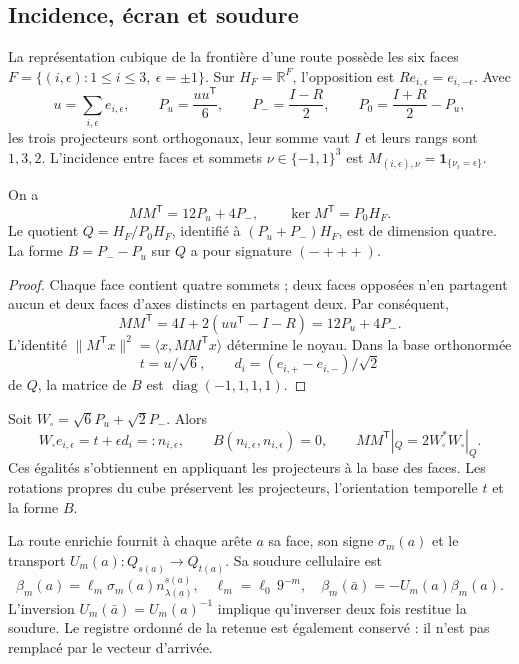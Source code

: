 \subsection{Incidence, écran et soudure}
\label{hmtcuatro:ant:pantalla}

La représentation cubique de la frontière d’une route possède les six faces \(F=\{(i,\epsilon):1\leq i\leq3,\ \epsilon=\pm1\}\). Sur \(H_F=\mathbb R^F\), l’opposition est \(Re_{i,\epsilon}=e_{i,-\epsilon}\). Avec
\[
 u=\sum_{i,\epsilon}e_{i,\epsilon},\qquad
 P_u=\frac{uu^{\mathsf T}}6,\qquad
 P_-=\frac{I-R}2,\qquad
 P_0=\frac{I+R}2-P_u ,
\]
les trois projecteurs sont orthogonaux, leur somme vaut \(I\) et leurs rangs sont \(1,3,2\). L’incidence entre faces et sommets \(\nu\in\{-1,1\}^3\) est \(M_{(i,\epsilon),\nu}=\mathbf1_{\{\nu_i=\epsilon\}}\).

\begin{proposition}
\label{hmtcuatro:ant:prop-pantalla}
On a
\[
 MM^{\mathsf T}=12P_u+4P_-,\qquad
 \ker M^{\mathsf T}=P_0H_F .
\]
Le quotient \(Q=H_F/P_0H_F\), identifié à \((P_u+P_-)H_F\), est de dimension quatre. La forme \(B=P_--P_u\) sur \(Q\) a pour signature \((-+++)\).
\end{proposition}
\begin{proof}
Chaque face contient quatre sommets ; deux faces opposées n’en partagent aucun et deux faces d’axes distincts en partagent deux. Par conséquent,
\[
 MM^{\mathsf T}=4I+2(uu^{\mathsf T}-I-R)
              =12P_u+4P_- .
\]
L’identité \(\|M^{\mathsf T}x\|^2=\langle x,MM^{\mathsf T}x\rangle\) détermine le noyau. Dans la base orthonormée
\[
 t=u/\sqrt6,\qquad d_i=(e_{i,+}-e_{i,-})/\sqrt2
\]
de \(Q\), la matrice de \(B\) est \(\operatorname{diag}(-1,1,1,1)\).
\end{proof}

Soit \(W_\square=\sqrt6P_u+\sqrt2P_-\). Alors
\[
 W_\square e_{i,\epsilon}=t+\epsilon d_i=:n_{i,\epsilon},
 \qquad B(n_{i,\epsilon},n_{i,\epsilon})=0,\qquad
 MM^{\mathsf T}|_Q=2W_\square^*W_\square|_Q .
\]
Ces égalités s’obtiennent en appliquant les projecteurs à la base des faces. Les rotations propres du cube préservent les projecteurs, l’orientation temporelle \(t\) et la forme \(B\).

La route enrichie fournit à chaque arête \(a\) sa face, son signe \(\sigma_m(a)\) et le transport \(U_m(a):Q_{s(a)}\to Q_{t(a)}\). Sa soudure cellulaire est
\begin{equation}
 \beta_m(a)=\ell_m\sigma_m(a)n_{\lambda(\underline a)}^{s(a)},
 \quad \ell_m=\ell_0\,9^{-m},\quad
 \beta_m(\bar a)=-U_m(a)\beta_m(a).
 \label{hmtcuatro:ant:soldadura}
\end{equation}
L’inversion \(U_m(\bar a)=U_m(a)^{-1}\) implique qu’inverser deux fois restitue la soudure. Le registre ordonné de la retenue est également conservé : il n’est pas remplacé par le vecteur d’arrivée.

